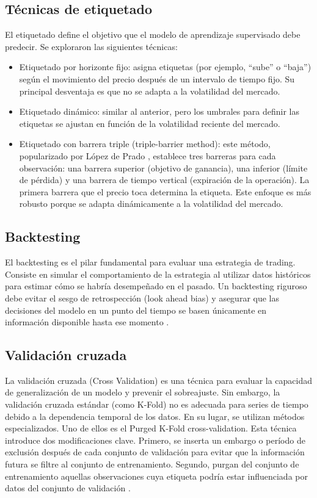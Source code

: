 \subsection{Técnicas de etiquetado}

El etiquetado define el objetivo que el modelo de aprendizaje supervisado debe predecir. Se exploraron las siguientes técnicas:
\begin{itemize}
    \item 	Etiquetado por horizonte fijo: asigna etiquetas (por ejemplo, ``sube'' o ``baja'') según el movimiento del precio después de un intervalo de tiempo fijo. Su principal desventaja es que no se adapta a la volatilidad del mercado.
    \item 	Etiquetado dinámico: similar al anterior, pero los umbrales para definir las etiquetas se ajustan en función de la volatilidad reciente del mercado.
    \item 	Etiquetado con barrera triple (triple-barrier method): este método, popularizado por López de Prado \cite{LoP:2018}, establece tres barreras para cada observación: una barrera superior (objetivo de ganancia), una inferior (límite de pérdida) y una barrera de tiempo vertical (expiración de la operación). La primera barrera que el precio toca determina la etiqueta. Este enfoque es más robusto porque se adapta dinámicamente a la volatilidad del mercado.
\end{itemize}


\subsection{Backtesting}
El backtesting es el pilar fundamental para evaluar una estrategia de trading. Consiste en simular el comportamiento de la estrategia al utilizar datos históricos para estimar cómo se habría desempeñado en el pasado. Un backtesting riguroso debe evitar el sesgo de retrospección (look ahead bias) y asegurar que las decisiones del modelo en un punto del tiempo se basen únicamente en información disponible hasta ese momento \cite{LoP:2018}.

\subsection{Validación cruzada }
La validación cruzada (Cross Validation) es una técnica para evaluar la capacidad de generalización de un modelo y prevenir el sobreajuste. Sin embargo, la validación cruzada estándar (como K-Fold) no es adecuada para series de tiempo debido a la dependencia temporal de los datos. En su lugar, se utilizan métodos especializados. Uno de ellos es el Purged K-Fold cross-validation. Esta técnica introduce dos modificaciones clave. Primero, se inserta un embargo o período de exclusión después de cada conjunto de validación para evitar que la información futura se filtre al conjunto de entrenamiento. Segundo, purgan del conjunto de entrenamiento aquellas observaciones cuya etiqueta podría estar influenciada por datos del conjunto de validación \cite{LoP:2018}.


